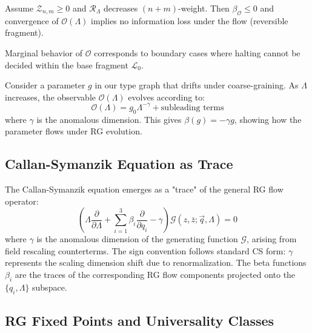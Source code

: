 \begin{proposition}
\label{prop:rg-corresp}
Assume $\mathcal{Z}_{n,m}\ge0$ and $\mathcal{R}_\Lambda$ decreases $(n+m)$-weight.
Then $\beta_\mathcal{O}\le0$ and convergence of $\mathcal{O}(\Lambda)$ implies
no information loss under the flow (reversible fragment).
\end{proposition}

\begin{conjecture}
\label{conj:marginal}
Marginal behavior of $\mathcal{O}$ corresponds to boundary cases where halting cannot
be decided within the base fragment $\mathcal{L}_0$.
\end{conjecture}

\begin{example}
\label{ex:synthetic-rg-flow}
Consider a parameter $g$ in our type graph that drifts under coarse-graining. As $\Lambda$ increases, the observable $\mathcal{O}(\Lambda)$ evolves according to:
\[
\mathcal{O}(\Lambda) = g_0 \Lambda^{-\gamma} + \text{subleading terms}
\]
where $\gamma$ is the anomalous dimension. This gives $\beta(g) = -\gamma g$, showing how the parameter flows under RG evolution.
\end{example}

\subsection{Callan-Symanzik Equation as Trace}

\begin{theorem}
\label{thm:callan-symanzik-trace}
The Callan-Symanzik equation emerges as a "trace" of the general RG flow operator:
\[
\left(\Lambda \frac{\partial}{\partial \Lambda} + \sum_{i=1}^3 \beta_i \frac{\partial}{\partial q_i} - \gamma\right) \mathcal{G}(z, \bar{z}; \vec{q}, \Lambda) = 0
\]
where $\gamma$ is the anomalous dimension of the generating function $\mathcal{G}$, arising from field rescaling counterterms. The sign convention follows standard CS form: $\gamma$ represents the scaling dimension shift due to renormalization. The beta functions $\beta_i$ are the traces of the corresponding RG flow components projected onto the $\{q_i, \Lambda\}$ subspace.
\end{theorem}

\subsection{RG Fixed Points and Universality Classes}

